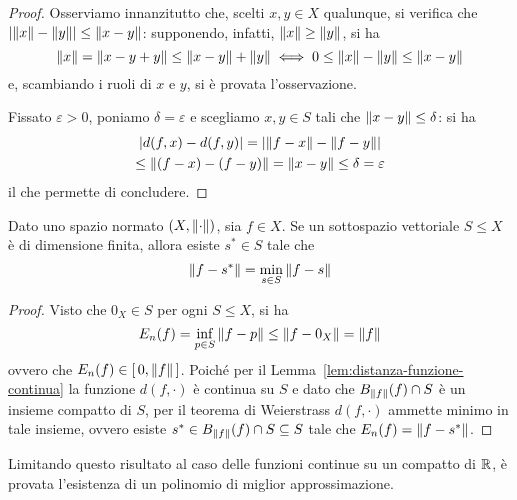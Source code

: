 	\begin{proof}
		Osserviamo innanzitutto che, scelti \(x, y \in X\) qualunque, si verifica che \(\abs{\norm{x} - \norm{y}} \le \norm{x - y}\): supponendo, infatti, \(\norm{x} \ge \norm{y}\), si ha
		\begin{equation*}
			\norm{x} = \norm{x - y + y} \le \norm{x - y} + \norm{y} \iff 0 \le \norm{x} - \norm{y} \le \norm{x - y}
		\end{equation*}
		e, scambiando i ruoli di \(x\) e \(y\), si è provata l'osservazione.
		
		Fissato \(\varepsilon > 0\), poniamo \(\delta = \varepsilon\) e scegliamo \(x, y \in S\) tali che \(\norm{x - y} \le \delta\): si ha
		\begin{multline*}
				\abs{d (f, x) - d (f, y)} = \abs{\norm{f - x} - \norm{f - y}} \\
				\le \norm{(f - x) - (f - y)} = \norm{x - y} \le \delta = \varepsilon
		\end{multline*}
		il che permette di concludere.
	\end{proof}

	\begin{teorema}\label{th:miglior-approx-esiste}
		Dato uno spazio normato \((X, \norm{\cdot})\), sia \(f \in X\). Se un sottospazio vettoriale \(S \le X\) è di dimensione finita, allora esiste \(s^* \in S\) tale che
		\begin{equation*}
			\norm{f - s^*} = \min_{s \in S} \norm{f - s}
		\end{equation*}
	\end{teorema}

	\begin{proof}
		Visto che \(0_X \in S\) per ogni \(S \le X\), si ha
		\begin{equation*}
			E_n (f) = \inf_{p \in S} \norm{f - p} \le \norm{f - 0_X} = \norm{f}
		\end{equation*}
		ovvero che \(E_n (f) \in [\, 0, \norm{f} \,]\). Poiché per il Lemma~\ref{lem:distanza-funzione-continua} la funzione \(d (f, \cdot)\) è continua su \(S\) e dato che \(B_{\norm{f}} (f) \cap S\) è un insieme compatto di \(S\), per il teorema di Weierstrass \(d (f, \cdot)\) ammette minimo in tale insieme, ovvero esiste \(s^* \in B_{\norm{f}} (f) \cap S \subseteq S\) tale che \(E_n (f) = \norm{f - s^*}\).
	\end{proof}

	Limitando questo risultato al caso delle funzioni continue su un compatto di \(\mathbb{R}\), è provata l'esistenza di un polinomio di miglior approssimazione.

